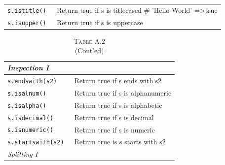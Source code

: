 \documentclass[a4paper,11pt]{book}
\begin{document}
\begin{appendices}
\begin{table}[!htbp]
\begin{tabular}{lp{11cm}}
\texttt{s.istitle() }             & Return true if s is titlecased \# 'Hello World' =\textgreater true                                                                              \\
\texttt{s.isupper()}              & Return true if s is uppercase                                                                                                                   \\ \midrule                                         
\end{tabular}
\end{table}

\begin{table}[!htbp]
\centering
\caption*{\textsc{Table A.2} \\ (Cont'ed)}
\label{tab:string_methods_cted}
\begin{tabular}{lp{11cm}}
\\ \midrule
\textit{Inspection I}             &                                                                                                                                                 \\ \midrule
\texttt{s.endswith(s2)   }        & Return true if s ends with s2                                                                                                                   \\
\texttt{s.isalnum()       }       & Return true if s is alphanumeric                                                                                                                \\
\texttt{s.isalpha()        }      & Return true if s is alphabetic                                                                                                                  \\
\texttt{s.isdecimal()       }     & Return true if s is decimal                                                                                                                     \\
\texttt{s.isnumeric()        }    & Return true if s is numeric                                                                                                                     \\
\texttt{s.startswith(s2)      }   & Return true is s starts with s2                                                                                                                 \\          
\midrule
\textit{Splitting I}              &                                                                                                                                                 \\ \midrule

\end{tabular}
\end{table}
\end{appendices}
\end{document}

